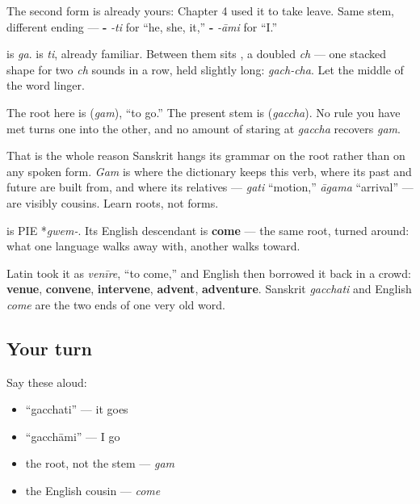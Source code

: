The second form is already yours: Chapter 4 used it to take leave. Same stem, different ending — \textbf{-} \emph{-ti} for \textquotedblleft{}he, she, it,\textquotedblright{} \textbf{-} \emph{-āmi} for \textquotedblleft{}I.\textquotedblright{}

\begin{sounds}
\textbf{} is \emph{ga}. \textbf{} is \emph{ti}, already familiar. Between them sits \textbf{}, a doubled \emph{ch} — one stacked shape for two \emph{ch} sounds in a row, held slightly long: \emph{gach-cha}. Let the middle of the word linger.
\end{sounds}

\begin{grammarlens}[title={Grammar Lens: the stem that hides its root}]
The root here is \textbf{} (\emph{gam}), \textquotedblleft{}to go.\textquotedblright{} The present stem is \textbf{} (\emph{gaccha}). No rule you have met turns one into the other, and no amount of staring at \emph{gaccha} recovers \emph{gam}.

That is the whole reason Sanskrit hangs its grammar on the root rather than on any spoken form. \emph{Gam} is where the dictionary keeps this verb, where its past and future are built from, and where its relatives — \textbf{} \emph{gati} \textquotedblleft{}motion,\textquotedblright{} \textbf{} \emph{āgama} \textquotedblleft{}arrival\textquotedblright{} — are visibly cousins. Learn roots, not forms.
\end{grammarlens}

\begin{cousinweb}
\textbf{} is PIE *\emph{gwem-}. Its English descendant is \textbf{come} — the same root, turned around: what one language walks away with, another walks toward.

Latin took it as \emph{venīre}, \textquotedblleft{}to come,\textquotedblright{} and English then borrowed it back in a crowd: \textbf{venue}, \textbf{convene}, \textbf{intervene}, \textbf{advent}, \textbf{adventure}. Sanskrit \emph{gacchati} and English \emph{come} are the two ends of one very old word.
\end{cousinweb}

\subsection*{Your turn}
Say these aloud:

\begin{itemize}
\raggedright
  \item \textquotedblleft{}gacchati\textquotedblright{} — it goes
  \item \textquotedblleft{}gacchāmi\textquotedblright{} — I go
  \item the root, not the stem — \emph{gam}
  \item the English cousin — \emph{come}
\end{itemize}


